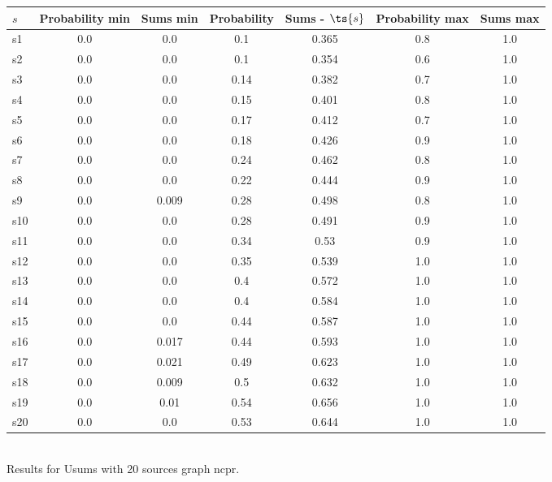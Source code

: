 \documentclass{article}
\begin{document}
\noindent\begin{tabular}{|l|c|c|c|c|c|c|}
\hline
$s$& Probability min & Sums min & Probability & Sums - $\ts{s}$ & Probability max & Sums max\\
\hline
s1 &0.0 & 0.0 & 0.1 & 0.365 & 0.8 & 1.0\\
\hline
s2 &0.0 & 0.0 & 0.1 & 0.354 & 0.6 & 1.0\\
\hline
s3 &0.0 & 0.0 & 0.14 & 0.382 & 0.7 & 1.0\\
\hline
s4 &0.0 & 0.0 & 0.15 & 0.401 & 0.8 & 1.0\\
\hline
s5 &0.0 & 0.0 & 0.17 & 0.412 & 0.7 & 1.0\\
\hline
s6 &0.0 & 0.0 & 0.18 & 0.426 & 0.9 & 1.0\\
\hline
s7 &0.0 & 0.0 & 0.24 & 0.462 & 0.8 & 1.0\\
\hline
s8 &0.0 & 0.0 & 0.22 & 0.444 & 0.9 & 1.0\\
\hline
s9 &0.0 & 0.009 & 0.28 & 0.498 & 0.8 & 1.0\\
\hline
s10 &0.0 & 0.0 & 0.28 & 0.491 & 0.9 & 1.0\\
\hline
s11 &0.0 & 0.0 & 0.34 & 0.53 & 0.9 & 1.0\\
\hline
s12 &0.0 & 0.0 & 0.35 & 0.539 & 1.0 & 1.0\\
\hline
s13 &0.0 & 0.0 & 0.4 & 0.572 & 1.0 & 1.0\\
\hline
s14 &0.0 & 0.0 & 0.4 & 0.584 & 1.0 & 1.0\\
\hline
s15 &0.0 & 0.0 & 0.44 & 0.587 & 1.0 & 1.0\\
\hline
s16 &0.0 & 0.017 & 0.44 & 0.593 & 1.0 & 1.0\\
\hline
s17 &0.0 & 0.021 & 0.49 & 0.623 & 1.0 & 1.0\\
\hline
s18 &0.0 & 0.009 & 0.5 & 0.632 & 1.0 & 1.0\\
\hline
s19 &0.0 & 0.01 & 0.54 & 0.656 & 1.0 & 1.0\\
\hline
s20 &0.0 & 0.0 & 0.53 & 0.644 & 1.0 & 1.0\\
\hline
\end{tabular}\\

\noindent Results for Usums with 20 sources graph ncpr.
\end{document}
